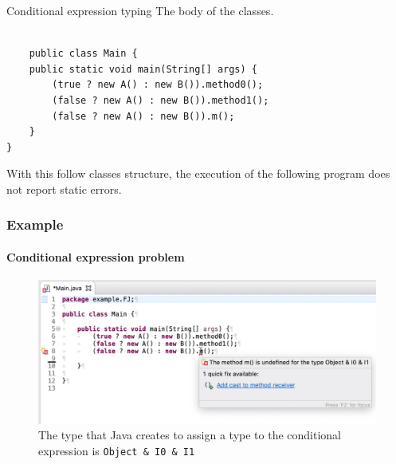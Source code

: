 \documentclass{beamer}
\begin{document}
	\begin{frame}[fragile]{Conditional expression typing}
	\boldmath
The body of the classes.	\begin{flushleft}
		\begin{lstlisting}[basicstyle=\scriptsize]
	
    public class Main {
    public static void main(String[] args) {
		(true ? new A() : new B()).method0();
		(false ? new A() : new B()).method1();
		(false ? new A() : new B()).m();
	}
}
	\end{lstlisting}
	\end{flushleft}
	With this follow classes structure, the execution of the following program does not report static errors.
	\end{frame}
	
	\begin{frame}
\frametitle{Example}
\framesubtitle{Conditional expression problem}
\begin{figure}
\centering
\includegraphics[width=1\linewidth]{images/example-intersection-type.png}
\caption{The type that Java creates to assign a type to the conditional expression is \texttt{Object \& I0 \& I1}}
\label{fig:mainres}
\end{figure}
\end{frame}
\end{document}
